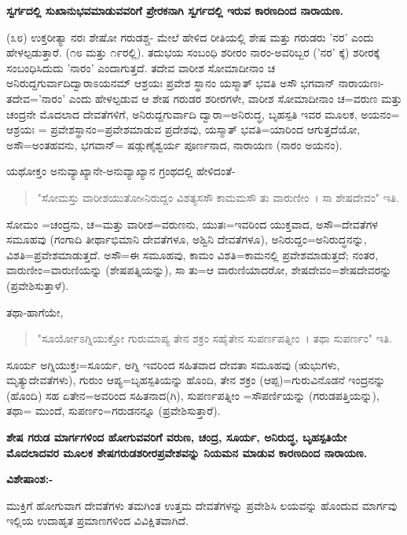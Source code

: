 \begin{center}
\textbf{ಸ್ವರ್ಗದಲ್ಲಿ ಸುಖಾನುಭವಮಾಡುವವರಿಗೆ ಪ್ರೇರಕನಾಗಿ ಸ್ವರ್ಗದಲ್ಲಿ ಇರುವ ಕಾರಣದಿಂದ ನಾರಾಯಣ.}
\end{center}

(೩೮) ಉಕ್ತರೀತ್ಯಾ ನರಃ ಶೇಷೋ ಗರುಡಶ್ಚ- ಮೇಲೆ ಹೇಳಿದ ರೀತಿಯಲ್ಲಿ ಶೇಷ ಮತ್ತು ಗರುಡರು 'ನರ' ಎಂದು ಹೇಳಲ್ಪಡುತ್ತಾರೆ. (೧೮ ಮತ್ತು ೧೯ರಲ್ಲಿ). ತದುಭಯ ಸಂಬಂಧಿ ಶರೀರಂ ನಾರಂ-ಅವರಿಬ್ಬರ ('ನರ' ಕ್ಕೆ) ಶರೀರಕ್ಕೆ ಸಂಬಂಧಿಸಿದುದು 'ನಾರಂ' ಎಂದಾಗುತ್ತದೆ. ತದೇವ ವಾರೀಶ ಸೋಮಾದೀನಾಂ ಚ ಅನಿರುದ್ದಗುರ್ವಾದಿದ್ವಾರಾಽಯನಮ್ ಆಶ್ರಯಃ ಪ್ರವೇಶ ಸ್ಥಾನಂ ಯಸ್ಮಾತ್ ಭವತಿ ಅಸೌ ಭಗವಾನ್ ನಾರಾಯಣಃ-ತದೇವ='ನಾರಂ' ಎಂದು ಹೇಳಲ್ಪಡುವ ಆ ಶೇಷ ಗರುಡರ ಶರೀರಗಳೇ, ವಾರೀಶ ಸೋಮಾದೀನಾಂ ಚ=ವರುಣ ಮತ್ತು ಚಂದ್ರನೇ ಮೊದಲಾದ ದೇವತೆಗಳಿಗೆ, ಅನಿರುದ್ದಗುರ್ವಾದಿ ದ್ವಾರಾ=ಅನಿರುದ್ಧ, ಬೃಹಸ್ಪತಿ ಇವರ ಮೂಲಕ, ಅಯನಂ= ಆಶ್ರಯಃ = ಪ್ರವೇಶಸ್ಥಾನಂ=ಪ್ರವೇಶಮಾಡುವ ಪ್ರದೇಶವು, ಯಸ್ಮಾತ್ ಭವತಿ=ಯಾರಿಂದ ಆಗುತ್ತದೆಯೋ, ಅಸೌ=ಅಂತಹವನು, ಭಗವಾನ್= ಷಡ್ಗುಣೈಶ್ವರ್ಯ ಪೂರ್ಣನಾದ, ನಾರಾಯಣ (ನಾರಂ ಅಯನಂ).

ಯಥೋಕ್ತಂ ಅನುವ್ಯಾಖ್ಯಾನೇ-ಅನುವ್ಯಾಖ್ಯಾನ ಗ್ರಂಥದಲ್ಲಿ ಹೇಳಿದಂತೆ-

\begin{verse}
"ಸೋಮಸ್ತು ವಾರೀಶಯುತೋsನಿರುದ್ದಂ ವಿಶತ್ಯಸಸೌ ಕಾಮಮಸೌ ತು ವಾರುಣೀಂ~। ಸಾ ಶೇಷದೇವಂ" ಇತಿ.
\end{verse}

ಸೋಮಂ =ಚಂದ್ರನು, ಚ=ಮತ್ತು ವಾರೀಶ=ವರುಣನು, ಯುತಃ=ಇವರಿಂದ ಯುಕ್ತವಾದ, ಅಸೌ=ದೇವತೆಗಳ ಸಮೂಹವು (ಗಂಗಾದಿ ತೀರ್ಥಾಭಿಮಾನಿ ದೇವತೆಗಳೂ, ಅಶ್ವಿನಿ ದೇವತೆಗಳೂ), ಅನಿರುದ್ದಂ=ಅನಿರುದ್ಧನನ್ನು, ವಿಶತಿ=ಪ್ರವೇಶಮಾಡುತ್ತದೆ. ಅಸೌ=ಈ ಸಮೂಹವು, ಕಾಮಂ ವಿಶತಿ=ಕಾಮನಲ್ಲಿ ಪ್ರವೇಶಮಾಡುತ್ತದೆ; ನಂತರ, ವಾರುಣೀಂ=ವಾರುಣಿಯನ್ನು (ಶೇಷಪತ್ನಿಯನ್ನು), ಸಾ ತು=ಆ ವಾರುಣಿಯಾದರೋ, ಶೇಷದೇವಂ=ಶೇಷದೇವರನ್ನು (ಪ್ರವೇಶಿಸುತ್ತಾಳೆ).

ತಥಾ-ಹಾಗೆಯೇ,

\begin{verse}
"ಸೂರ್ಯೋಽಗ್ನಿಯುಕ್ತೋ ಗುರುಮಾಪ್ಯ ತೇನ ಶಕ್ರಂ ಸಹೈತೇನ ಸುಪರ್ಣಪತ್ನೀಂ~। ತಥಾ ಸುಪರ್ಣಂ" ಇತಿ.
\end{verse}

ಸೂರ್ಯ ಅಗ್ನಿಯುಕ್ತಃ=ಸೂರ್ಯ, ಅಗ್ನಿ ಇವರಿಂದ ಸಹಿತವಾದ ದೇವತಾ ಸಮೂಹವು (ಋಭುಗಳು, ಮೃತ್ಯುದೇವತೆಗಳು), ಗುರುಂ ಆಪ್ಯ=ಬೃಹಸ್ಪತಿಯನ್ನು ಹೊಂದಿ, ತೇನ ಶಕ್ರಂ (ಆಪ್ಪ)=ಗುರುವಿನೊಡನೆ ಇಂದ್ರನನ್ನು (ಹೊಂದಿ) ಸಹ ಏತೇನ=ಅವರಿಂದ ಸಹಿತನಾದ(ಗಿ), ಸುಪರ್ಣಪತ್ನೀಂ =ಸೌಪರ್ಣಿಯನ್ನು (ಗರುಡಪತ್ತಿಯನ್ನು), ತಥಾ= ಮುಂದೆ, ಸುಪರ್ಣಂ=ಗರುಡನನ್ನೂ (ಪ್ರವೇಶಿಸುತ್ತಾರೆ).

\begin{center}
\textbf{ಶೇಷ ಗರುಡ ಮಾರ್ಗಗಳಿಂದ ಹೋಗುವವರಿಗೆ ವರುಣ, ಚಂದ್ರ, ಸೂರ್ಯ, ಅನಿರುದ್ಧ, ಬೃಹಸ್ಪತಿಯೇ ಮೊದಲಾದವರ ಮೂಲಕ ಶೇಷಗರುಡಶರೀರಪ್ರವೇಶವನ್ನು ನಿಯಮನ ಮಾಡುವ ಕಾರಣದಿಂದ ನಾರಾಯಣ.}
\end{center}

\noindent
\textbf{ವಿಶೇಷಾಂಶ:-}

ಮುಕ್ತಿಗೆ ಹೋಗುವಾಗ ದೇವತೆಗಳು ತಮಗಿಂತ ಉತ್ತಮ ದೇವತೆಗಳನ್ನು ಪ್ರವೇಶಿಸಿ ಲಯವನ್ನು ಹೊಂದುವ ಮಾರ್ಗವು ಇಲ್ಲಿಯ ಉದಾಹೃತ ಪ್ರಮಾಣಗಳಿಂದ ವಿವಿಕ್ಷಿತವಾಗಿದೆ.

